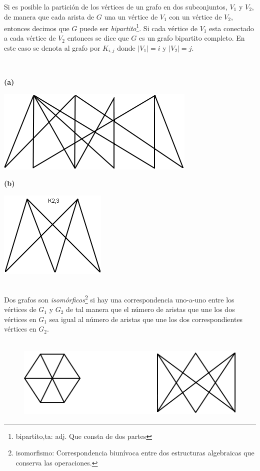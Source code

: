 \documentclass[10pt,a5paper]{book}
\begin{document}
Si es posible la partición de los vértices de un grafo en dos subconjuntos, $V_{1}$ y $V_{2}$, de manera que cada arista de $G$ una un vértice de $V_{1}$ con un vértice de $V_{2}$, entonces decimos que $G$ puede ser \emph{bipartito}\footnote{bipartito,ta: adj. Que consta de dos partes}. Si cada vértice de $V_1$ esta conectado a cada vértice de $V_2$ entonces se dice que $G$ es un grafo bipartito completo. En este caso se denota al grafo por $K_{i,j}$ donde $|V_1| = i$ y $|V_2| = j$.
\pagebreak
\begin{figure}
  \caption{ }
\hrulefill{}\\
\end{figure}
\begin{flushleft}
  \textbf{(a)}
  \parbox{1cm}
  {
    \includegraphics[scale=0.4]{Figura1_5.png}
  }
\end{flushleft}
\begin{flushright}
  \textbf{(b)}
  \parbox{3cm}
  {
    \includegraphics[scale=0.5]{Figura1_5b.png}
  }
\end{flushright}
\hrulefill{}\\

Dos grafos son \emph{isomórficos}\footnote{isomorfismo: Correspondencia biunívoca entre dos estructuras algebraicas que conserva las operaciones.} si hay una correspondencia uno-a-uno entre los vértices de $G_1$ y $G_2$ de tal manera que el número de aristas que une los dos vértices en $G_1$ sea igual al número de aristas que une los dos correspondientes vértices en $G_2$.\\

\begin{figure}[H]
  \centering
  \caption{ }
  \hrulefill{}\\
  \includegraphics[scale=0.5]{Figura1_6.png}
\end{figure}
\hrulefill{}
\end{document}
